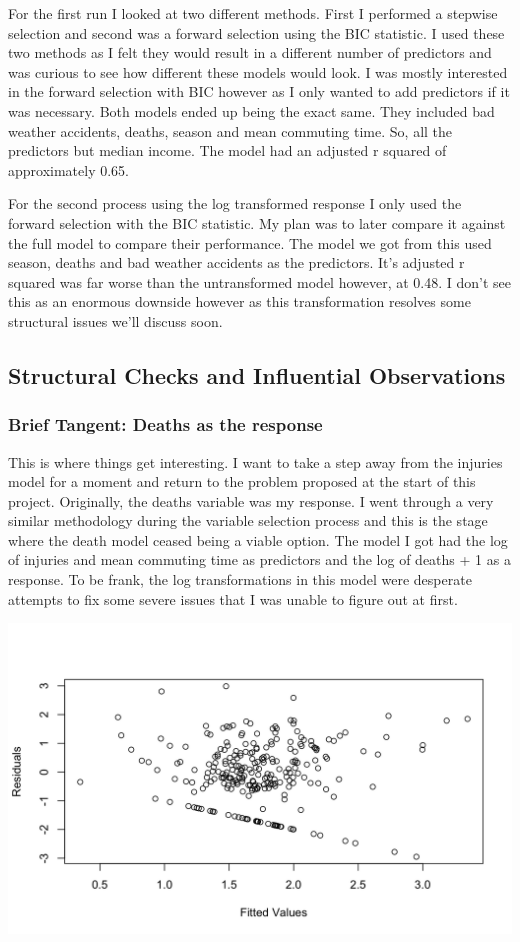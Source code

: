For the first run I looked at two different methods. First I performed a stepwise selection and second was a forward selection using the BIC statistic. I used these two methods as I felt they would result in a different number of predictors and was curious to see how different these models would look. I was mostly interested in the forward selection with BIC however as I only wanted to add predictors if it was necessary. Both models ended up being the exact same. They included bad weather accidents, deaths, season and mean commuting time. So, all the predictors but median income. The model had an adjusted r squared of approximately 0.65.

For the second process using the log transformed response I only used the forward selection with the BIC statistic. My plan was to later compare it against the full model to compare their performance. The model we got from this used season, deaths and bad weather accidents as the predictors. It's adjusted r squared was far worse than the untransformed model however, at 0.48. I don't see this as an enormous downside however as this transformation resolves some structural issues we'll discuss soon.

\subsection*{Structural Checks and Influential Observations}

\subsubsection*{Brief Tangent: Deaths as the response}

This is where things get interesting. I want to take a step away from the injuries model for a moment and return to the problem proposed at the start of this project. Originally, the deaths variable was my response. I went through a very similar methodology during the variable selection process and this is the stage where the death model ceased being a viable option. The model I got had the log of injuries and mean commuting time as predictors and the log of deaths + 1 as a response. To be frank, the log transformations in this model were desperate attempts to fix some severe issues that I was unable to figure out at first. 

\begin{center}
    \includegraphics[width=0.8\columnwidth]{../presentation/presentation_images/deaths_residual_plot.png}
\end{center}


